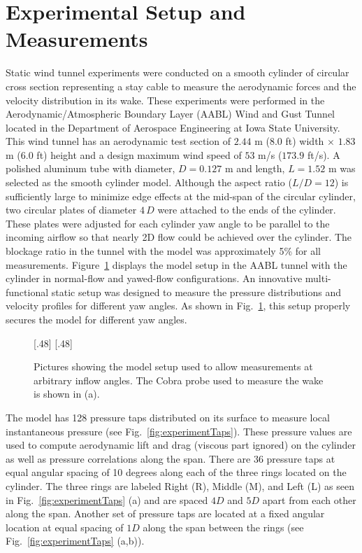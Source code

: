 \section{Experimental Setup and Measurements}
\label{sec:experiments}
%
Static wind tunnel experiments were conducted on a smooth cylinder of circular
cross section representing a stay cable to measure the aerodynamic forces and
the velocity distribution in its wake. These experiments were performed in the
Aerodynamic/Atmospheric Boundary Layer (AABL) Wind and Gust Tunnel located in
the Department of Aerospace Engineering at Iowa State University. This wind
tunnel has an aerodynamic test section of $2.44$ m ($8.0$ ft) width $\times$
$1.83$ m ($6.0$ ft) height and a design maximum wind speed of $53$ m/s ($173.9$
ft/s). A polished aluminum tube with diameter, $D=0.127$ m and length, $L=1.52$
m was selected as the smooth cylinder model. Although the aspect ratio
($L/D=12$) is sufficiently large to minimize edge effects at the mid-span of
the circular cylinder, two circular plates of diameter $4\,D$ were attached to
the ends of the cylinder. These plates were adjusted for each cylinder yaw
angle to be parallel to the incoming airflow so that nearly 2D flow could be
achieved over the cylinder.  The blockage ratio in the tunnel with the model
was approximately 5\% for all measurements.  Figure~\ref{fig:ExpSetup} displays
the model setup in the AABL tunnel with the cylinder in normal-flow and
yawed-flow configurations. An innovative multi-functional static setup was
designed to measure the pressure distributions and velocity profiles for
different yaw angles. As shown in Fig.~\ref{fig:ExpSetup}, this setup properly
secures the model for different yaw angles.
%
\begin{figure}[htb!]
  \centering
    [.48\linewidth]{}
  \hspace*{\fill}
    [.48\linewidth]{}
  \caption{Pictures showing the model setup used to allow measurements at
    arbitrary inflow angles. The Cobra probe used to measure the wake is shown in
    (a).}
  \label{fig:ExpSetup}
\end{figure}

The model has 128 pressure taps distributed on its surface to measure local
instantaneous pressure (see Fig.~\ref{fig:experimentTaps}). These pressure
values are used to compute aerodynamic lift and drag (viscous part ignored) on
the cylinder as well as pressure correlations along the span. There are 36
pressure taps at equal angular spacing of 10 degrees along each of the three
rings located on the cylinder. The three rings are labeled Right (R), Middle
(M), and Left (L) as seen in Fig.~\ref{fig:experimentTaps} (a) and are spaced
$4D$ and $5D$ apart from each other along the span. Another set of pressure
taps are located at a fixed angular location at equal spacing of $1D$ along the
span between the rings (see Fig.~\ref{fig:experimentTaps} (a,b)).

